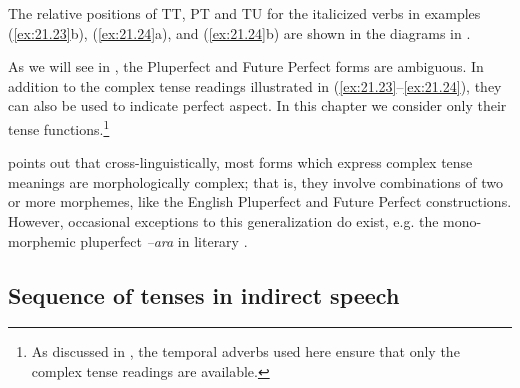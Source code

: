 The relative positions of TT, PT and TU for the italicized verbs in examples (\ref{ex:21.23}b), (\ref{ex:21.24}a), and (\ref{ex:21.24}b) are shown in the diagrams in .


\ea \label{ex:21.25}
\begin{xlist}
\medskip
{}
\medskip
{}
\end{xlist}
\z


As we will see in , the Pluperfect and Future Perfect forms are ambiguous. In addition to the complex tense readings illustrated in (\ref{ex:21.23}--\ref{ex:21.24}), they can also be used to indicate perfect aspect. In this chapter we consider only their tense functions.\footnote{As discussed in , the temporal adverbs used here ensure that only the complex tense readings are available.}



\citet{Comrie1985} points out that cross-linguistically, most forms which express complex tense meanings are morphologically complex; that is, they involve combinations of two or more morphemes, like the English Pluperfect and Future Perfect constructions. However, occasional exceptions to this generalization do exist, e.g. the mono-morphemic pluperfect \textit{–ara} in literary .


\subsection{Sequence of tenses in indirect speech}\label{sec:21.4.2}

